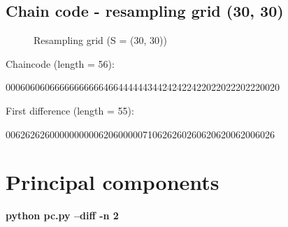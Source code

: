\pagebreak
\subsection{Chain code - resampling grid (30, 30)}

\begin{figure}[!htb]\centering
    \caption{\small{Resampling grid (S = (30, 30))}}
\end{figure}

Chaincode (length = 56):
\begin{center}
00060606066666666666466444444344242422422022022202220020
\end{center}

\bigskip

First difference (length = 55):
\begin{center}
0062626260000000000620600000710626260260620620062006026
\end{center}


\pagebreak

\section{Principal components}

\textbf{python pc.py --diff -n 2}



\pagebreak
